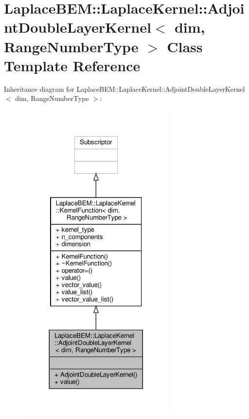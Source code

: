 \hypertarget{classLaplaceBEM_1_1LaplaceKernel_1_1AdjointDoubleLayerKernel}{}\section{Laplace\+B\+EM\+:\+:Laplace\+Kernel\+:\+:Adjoint\+Double\+Layer\+Kernel$<$ dim, Range\+Number\+Type $>$ Class Template Reference}
\label{classLaplaceBEM_1_1LaplaceKernel_1_1AdjointDoubleLayerKernel}


Inheritance diagram for Laplace\+B\+EM\+:\+:Laplace\+Kernel\+:\+:Adjoint\+Double\+Layer\+Kernel$<$ dim, Range\+Number\+Type $>$\+:\nopagebreak
\begin{figure}[H]
\begin{center}
\leavevmode
\includegraphics[width=224pt]{classLaplaceBEM_1_1LaplaceKernel_1_1AdjointDoubleLayerKernel__inherit__graph}
\end{center}
\end{figure}


